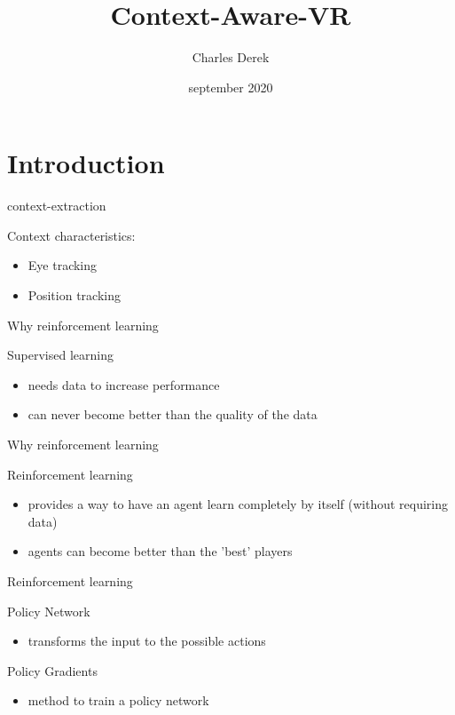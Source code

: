 \documentclass{beamer}
\title[Your Short Title]{Context-Aware-VR}
\author{Charles Derek}
\institute{University of Antwerp}
\date{september 2020}
\begin{document}
\begin{frame}
  \titlepage
\end{frame}


\section{Introduction}

\begin{frame}{context-extraction}


Context characteristics: 

\begin{itemize}
	\item Eye tracking
	\item Position tracking
\end{itemize}

\end{frame}


\begin{frame}{Why reinforcement learning}


Supervised learning 

\begin{itemize}
	\item needs data to increase performance
	\item can never become better than the quality of the data
\end{itemize}

\end{frame}


\begin{frame}{Why reinforcement learning}

Reinforcement learning 

\begin{itemize}
	\item provides a way to have an agent learn completely by itself (without requiring data) 
	\item agents can become better than the 'best' players
\end{itemize}

\end{frame}


\begin{frame}{Reinforcement learning}

Policy Network
\begin{itemize}
	\item transforms the input to the possible actions 
\end{itemize}

Policy Gradients
\begin{itemize}
	\item method to train a policy network
\end{itemize}

\end{frame}
\end{document}
